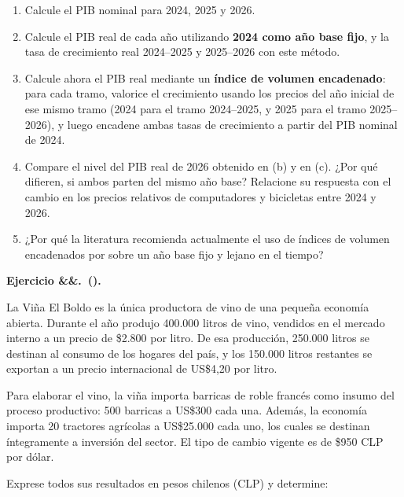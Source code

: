 \documentclass[11pt]{article}
\newcounter{ejercicio}
\newcommand{\ejercicio}[1][]{%
  \stepcounter{ejercicio}%
  \bigskip\noindent\textbf{Ejercicio \arabic{ejercicio}\ifx&#1&\relax.\else\ (#1).\fi}\ %
}
\newenvironment{partes}
  {\begin{enumerate}[label=(\alph*), leftmargin=1.5cm]}
  {\end{enumerate}}
\begin{document}
\begin{partes}
  \item Calcule el PIB nominal para 2024, 2025 y 2026.
  \item Calcule el PIB real de cada año utilizando \textbf{2024 como año base fijo}, y la tasa de crecimiento real 2024--2025 y 2025--2026 con este método.
  \item Calcule ahora el PIB real mediante un \textbf{índice de volumen encadenado}: para cada tramo, valorice el crecimiento usando los precios del año inicial de ese mismo tramo (2024 para el tramo 2024--2025, y 2025 para el tramo 2025--2026), y luego encadene ambas tasas de crecimiento a partir del PIB nominal de 2024.
  \item Compare el nivel del PIB real de 2026 obtenido en (b) y en (c). ¿Por qué difieren, si ambos parten del mismo año base? Relacione su respuesta con el cambio en los precios relativos de computadores y bicicletas entre 2024 y 2026.
  \item ¿Por qué la literatura recomienda actualmente el uso de índices de volumen encadenados por sobre un año base fijo y lejano en el tiempo?
\end{partes}


\newpage
\ejercicio
La Viña El Boldo es la única productora de vino de una pequeña economía abierta. Durante el año produjo 400.000 litros de vino, vendidos en el mercado interno a un precio de \$2.800 por litro. De esa producción, 250.000 litros se destinan al consumo de los hogares del país, y los 150.000 litros restantes se exportan a un precio internacional de US\$4,20 por litro.

Para elaborar el vino, la viña importa barricas de roble francés como insumo del proceso productivo: 500 barricas a US\$300 cada una. Además, la economía importa 20 tractores agrícolas a US\$25.000 cada uno, los cuales se destinan íntegramente a inversión del sector. El tipo de cambio vigente es de \$950 CLP por dólar.

Exprese todos sus resultados en pesos chilenos (CLP) y determine:
\end{document}

